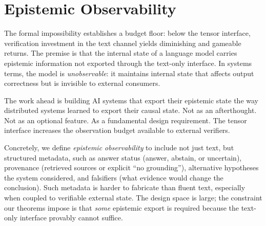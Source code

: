 \section{Epistemic Observability}\label{sec:escape}

The formal impossibility establishes a budget floor: below the tensor
interface, verification investment in the text channel yields diminishing and
gameable returns. The premise is that the internal state of a language model
carries epistemic information not exported through the text-only interface. In
systems terms, the model is \emph{unobservable}: it maintains internal state
that affects output correctness but is invisible to external consumers.

The work ahead is building AI systems that export their epistemic state the way
distributed systems learned to export their causal state. Not as an
afterthought. Not as an optional feature. As a fundamental design requirement.
The tensor interface increases the observation budget available to external
verifiers.

Concretely, we define \emph{epistemic observability} to include not
just text, but structured metadata, such as answer status (answer, abstain, or
uncertain), provenance (retrieved sources or explicit ``no grounding''),
alternative hypotheses the system considered, and falsifiers (what evidence
would change the conclusion). Such metadata is harder to fabricate than fluent
text, especially when coupled to verifiable external state. The design space is
large; the constraint our theorems impose is that \emph{some} epistemic export
is required because the text-only interface provably cannot suffice.



